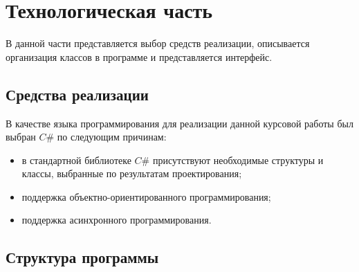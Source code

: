 \chapter{Технологическая часть}

В данной части представляется выбор средств реализации, описывается организация классов в программе и представляется интерфейс.

\section{Средства реализации}

В качестве языка программирования для реализации данной курсовой работы был выбран $C\#$ по следующим причинам:
\begin{itemize}[label=--]
	\item в стандартной библиотеке $C\#$ присутствуют необходимые структуры и классы, выбранные по результатам проектирования;
	\item поддержка объектно-ориентированного программирования;
	\item поддержка асинхронного программирования.
\end{itemize}

\section{Структура программы}

